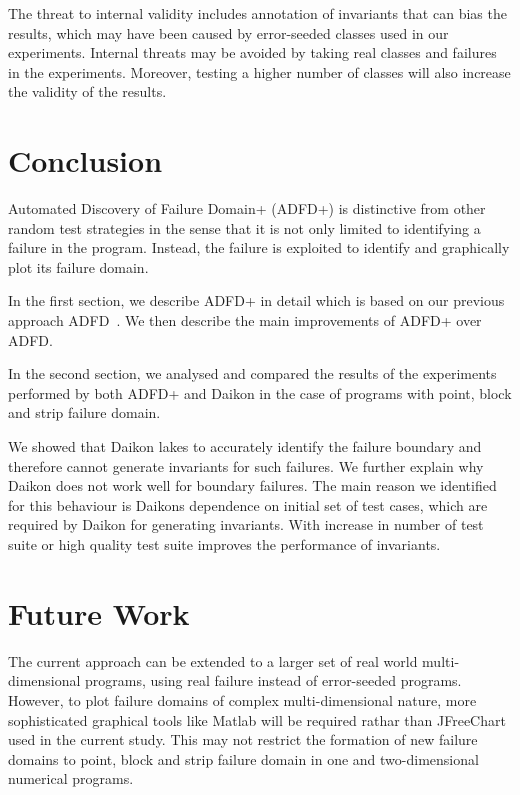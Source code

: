 The threat to internal validity includes annotation of invariants that can bias the results, which may have been caused by error-seeded classes used in our experiments. Internal threats may be avoided by taking real classes and failures in the experiments. Moreover, testing a higher number of classes will also increase the validity of the results.

\section{Conclusion}
Automated Discovery of Failure Domain+ (ADFD+) is distinctive from other random test strategies in the sense that it is not only limited to identifying a failure in the program. Instead, the failure is exploited to identify and graphically plot its failure domain.

In the first section, we describe ADFD+ in detail which is based on our previous approach ADFD~\cite{ahmad2013adfd}. We then describe the main improvements of ADFD+ over ADFD. 

In the second section, we analysed and compared the results of the experiments performed by both ADFD+ and Daikon in the case of programs with point, block and strip failure domain. 

We showed that Daikon lakes to accurately identify the failure boundary and therefore cannot generate invariants for such failures.  We further explain why Daikon does not work well for boundary failures. The main reason we identified for this behaviour is Daikons dependence on initial set of test cases, which are required by Daikon for generating invariants. With increase in number of test suite or high quality test suite improves the performance of invariants. 

\section{Future Work}\label{sec:intro6_15}
The current approach can be extended to a larger set of real world multi-dimensional programs, using real failure instead of error-seeded programs. However, to plot failure domains of complex multi-dimensional nature, more sophisticated graphical tools like Matlab will be required rathar than JFreeChart used in the current study. This may not restrict the formation of new failure domains to point, block and strip failure domain in one and two-dimensional numerical programs. 

